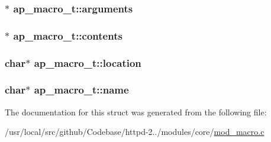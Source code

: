 \subsubsection[{\texorpdfstring{arguments}{arguments}}]{$\ast$ ap\+\_\+macro\+\_\+t\+::arguments}\hypertarget{structap__macro__t_a6002514892f6a7d816dcc8c8660b565c}{}\label{structap__macro__t_a6002514892f6a7d816dcc8c8660b565c}
\subsubsection[{\texorpdfstring{contents}{contents}}]{$\ast$ ap\+\_\+macro\+\_\+t\+::contents}\hypertarget{structap__macro__t_ab0fe3f2dd4f4f1befed600809b42f6db}{}\label{structap__macro__t_ab0fe3f2dd4f4f1befed600809b42f6db}
\subsubsection[{\texorpdfstring{location}{location}}]{\setlength{\rightskip}{0pt plus 5cm}char$\ast$ ap\+\_\+macro\+\_\+t\+::location}\hypertarget{structap__macro__t_a36304c1afc541b41450c47e04b4b5a23}{}\label{structap__macro__t_a36304c1afc541b41450c47e04b4b5a23}
\subsubsection[{\texorpdfstring{name}{name}}]{\setlength{\rightskip}{0pt plus 5cm}char$\ast$ ap\+\_\+macro\+\_\+t\+::name}\hypertarget{structap__macro__t_adfc21f30470f6c40efb9c1e56a44d616}{}\label{structap__macro__t_adfc21f30470f6c40efb9c1e56a44d616}


The documentation for this struct was generated from the following file\+:\begin{DoxyCompactItemize}
\item 
/usr/local/src/github/\+Codebase/httpd-\/2../modules/core/\hyperlink{mod__macro_8c}{mod\+\_\+macro.\+c}\end{DoxyCompactItemize}
